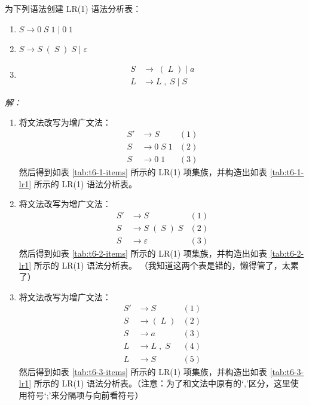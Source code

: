 \documentclass[12pt]{ctexart}
\begin{document}
    为下列语法创建 LR(1) 语法分析表：

    \begin{enumerate}
        \item $S \to 0\;S\;1\;|\;0\;1$
        \item $S \to S\;(\;S\;)\;S\;|\;\varepsilon$
        \item \begin{align*}
            S &\to \;(\;L\;)\;|\;a \\
            L &\to L\;,\;S\;|\;S
        \end{align*}
    \end{enumerate}

    \emph{解：}
    \begin{enumerate}
        \item 将文法改写为增广文法：
        \begin{align*}
            S' &\to S &(1) \\
            S &\to 0\;S\;1 &(2) \\
            S &\to 0\;1 &(3)
        \end{align*}
        然后得到如表 \ref{tab:t6-1-items} 所示的 LR(1) 项集族，并构造出如表 \ref{tab:t6-1-lr1} 所示的 LR(1) 语法分析表。
        \item 将文法改写为增广文法：
        \begin{align*}
            S' &\to S &(1) \\
            S &\to S\;(\;S\;)\;S &(2) \\
            S &\to \varepsilon &(3)
        \end{align*}
        然后得到如表 \ref{tab:t6-2-items} 所示的 LR(1) 项集族，并构造出如表 \ref{tab:t6-2-lr1} 所示的 LR(1) 语法分析表。
        （我知道这两个表是错的，懒得管了，太累了）
        \item 将文法改写为增广文法：
        \begin{align*}
            S' &\to S &(1) \\
            S  &\to (\;L\;) &(2) \\
            S  &\to a &(3) \\
            L  &\to L\;,\;S &(4) \\
            L  &\to S &(5)
        \end{align*}
        然后得到如表 \ref{tab:t6-3-items} 所示的 LR(1) 项集族，并构造出如表 \ref{tab:t6-3-lr1} 所示的 LR(1) 语法分析表。（注意：为了和文法中原有的`,'区分，这里使用符号`;'来分隔项与向前看符号）
    \end{enumerate}
\end{document}
